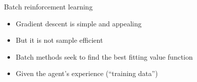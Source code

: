 \bgroup
\begin{frame}{Batch reinforcement learning}
\begin{itemize}
\item Gradient descent is simple and appealing
\item But it is not sample efficient
\item Batch methods seek to find the best fitting value function
\item Given the agent's experience (``training data'')
\end{itemize}
\end{frame}
\egroup